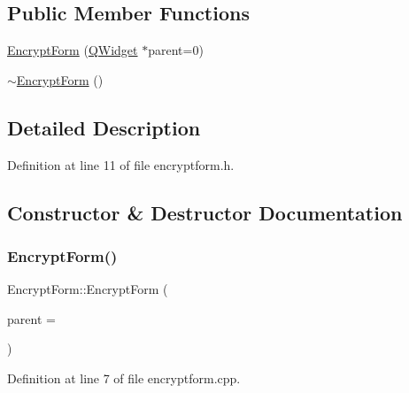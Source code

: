 \subsection*{Public Member Functions}
\begin{DoxyCompactItemize}
\item 
\hyperlink{class_encrypt_form_ac5cb0365d73aa360d7aba3a3ceab3d5b}{Encrypt\+Form} (\hyperlink{class_q_widget}{Q\+Widget} $\ast$parent=0)
\item 
\hyperlink{class_encrypt_form_ae816abae02f20b132d5eee2033849342}{$\sim$\+Encrypt\+Form} ()
\end{DoxyCompactItemize}


\subsection{Detailed Description}


Definition at line 11 of file encryptform.\+h.



\subsection{Constructor \& Destructor Documentation}
\hypertarget{class_encrypt_form_ac5cb0365d73aa360d7aba3a3ceab3d5b}{}\label{class_encrypt_form_ac5cb0365d73aa360d7aba3a3ceab3d5b} 
\subsubsection{\texorpdfstring{Encrypt\+Form()}{EncryptForm()}}
{\footnotesize\ttfamily Encrypt\+Form\+::\+Encrypt\+Form (\begin{DoxyParamCaption}\item[{\hyperlink{class_q_widget}{Q\+Widget} $\ast$}]{parent = {} }\end{DoxyParamCaption})\hspace{0.3cm}{\ttfamily [explicit]}}



Definition at line 7 of file encryptform.\+cpp.

\hypertarget{class_encrypt_form_ae816abae02f20b132d5eee2033849342}{}\label{class_encrypt_form_ae816abae02f20b132d5eee2033849342} 
